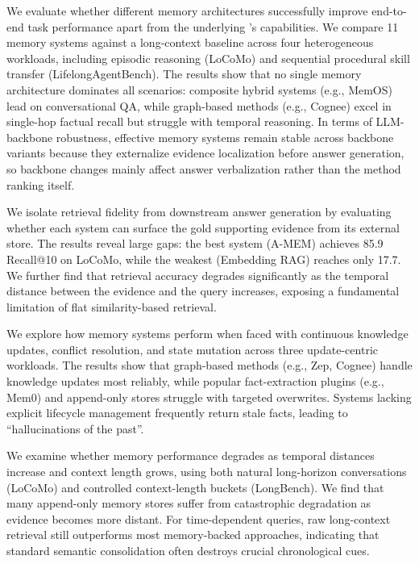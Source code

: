 \iffalse
{} 
We evaluate whether different memory architectures successfully improve end-to-end task performance apart from the underlying \llm's capabilities. We compare 11 memory systems against a long-context baseline across four heterogeneous workloads, including episodic reasoning (LoCoMo) and sequential procedural skill transfer (LifelongAgentBench). The results show that no single memory architecture dominates all scenarios: composite hybrid systems (e.g., MemOS) lead on conversational QA, while graph-based methods (e.g., Cognee) excel in single-hop factual recall but struggle with temporal reasoning. In terms of LLM-backbone robustness, effective memory systems remain stable across backbone variants because they externalize evidence localization before answer generation, so backbone changes mainly affect answer verbalization rather than the method ranking itself.

We isolate retrieval fidelity from downstream answer generation by evaluating whether each system can surface the gold supporting evidence from its external store. The results reveal large gaps: the best system (A-MEM) achieves 85.9 Recall@10 on LoCoMo, while the weakest (Embedding RAG) reaches only 17.7. We further find that retrieval accuracy degrades significantly as the temporal distance between the evidence and the query increases, exposing a fundamental limitation of flat similarity-based retrieval.

We explore how memory systems perform when faced with continuous knowledge updates, conflict resolution, and state mutation across three update-centric workloads. The results show that graph-based methods (e.g., Zep, Cognee) handle knowledge updates most reliably, while popular fact-extraction plugins (e.g., Mem0) and append-only stores struggle with targeted overwrites. Systems lacking explicit lifecycle management frequently return stale facts, leading to ``hallucinations of the past''.

We examine whether memory performance degrades as temporal distances increase and context length grows, using both natural long-horizon conversations (LoCoMo) and controlled context-length buckets (LongBench). We find that many append-only memory stores suffer from catastrophic degradation as evidence becomes more distant. For time-dependent queries, raw long-context retrieval still outperforms most memory-backed approaches, indicating that standard semantic consolidation often destroys crucial chronological cues.

